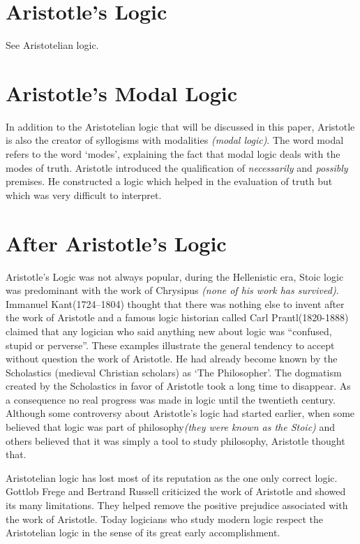 \documentclass[12pt]{article}
\begin{document}
\section*{Aristotle's Logic}

See Aristotelian logic.

\section*{Aristotle's Modal Logic}

In addition to the Aristotelian logic that will be discussed in this paper, Aristotle is also the creator of syllogisms with modalities \textit{(modal logic)}.  The word modal refers to the word `modes', explaining the fact that modal logic deals with the modes of truth.  Aristotle introduced the qualification of \emph{necessarily} and \emph{possibly} premises.  He constructed a logic which helped in the evaluation of truth but which was very difficult to interpret.\cite{SR}

\section*{After Aristotle's Logic}

Aristotle's Logic was not always popular, during the Hellenistic era, Stoic logic was predominant with the work of Chrysipus \textit{(none of his work has survived)}.\cite{SR}  Immanuel Kant(1724--1804) thought that there was nothing else to invent after the work of Aristotle and a famous logic historian called Carl Prantl(1820-1888) claimed that any logician who said anything new about logic was ``confused, stupid or perverse''.\cite{SR}  These examples illustrate the general tendency to accept without question the work of Aristotle.  He had already become known by the Scholastics (medieval Christian scholars) as `The Philosopher'.  The dogmatism created by the Scholastics in favor of Aristotle took a long time to disappear.\cite{WAL}  As a consequence no real progress was made in logic until the twentieth century.  Although some controversy about Aristotle's logic had started  earlier, when some believed that logic was part of philosophy\textit{(they were known as the Stoic)} and others believed that it was simply a tool to study philosophy, Aristotle thought that.\cite{SR}  

Aristotelian logic has lost most of its reputation as the one only correct logic.  Gottlob Frege and Bertrand Russell criticized the work of Aristotle and showed its many limitations.  They helped remove the positive prejudice associated with the work of Aristotle.  Today logicians who study modern logic respect the Aristotelian logic in the sense of its great early accomplishment.\cite{SR}
\end{document}
